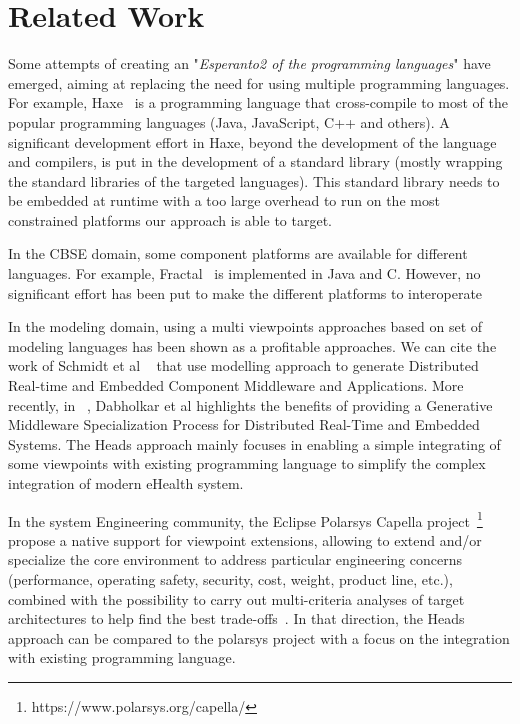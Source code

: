 \section{Related Work}

Some attempts of creating an "\textit{Esperanto2 of the programming languages}" have emerged, aiming at replacing the need for using multiple programming languages. For example, Haxe~\cite{dasnois2011haxe} is a programming language that cross-compile to most of the popular programming languages (Java, JavaScript, C++ and others). A significant development effort in Haxe, beyond the development of the language and compilers, is put in the development of a standard library (mostly wrapping the standard libraries of the targeted languages). This standard library needs to be embedded at runtime with a too large overhead to run on the most constrained platforms our approach is able to target. 

In the CBSE domain, some component platforms are available for different languages. For example, Fractal~\cite{bruneton2006fractal} is implemented in Java and C. However, no significant effort has been put to make the different platforms to interoperate 

In the modeling domain, using a multi viewpoints approaches based on set of modeling languages has been shown as a profitable approaches. We can cite the work of Schmidt et al ~\cite{DBLP:conf/middleware/GokhaleSLNW03} that use modelling approach to generate Distributed Real-time and Embedded Component Middleware and Applications. More recently, in  ~\cite{5753608}, Dabholkar et al highlights the benefits of providing a Generative Middleware Specialization Process for Distributed Real-Time and Embedded Systems.  The Heads approach  mainly focuses in enabling a simple integrating of some viewpoints with existing programming language to simplify the complex integration of modern eHealth system. 

In the system Engineering community, the Eclipse Polarsys Capella project~\footnote{https://www.polarsys.org/capella/} propose a  native support for viewpoint extensions, allowing to extend and/or specialize the core environment to address particular engineering concerns (performance, operating safety, security, cost, weight, product line, etc.), combined with the possibility to carry out multi-criteria analyses of target architectures to help find the best trade-offs~\cite{voirin2013arcadia}. In that direction, the Heads approach can be compared to the polarsys project with a focus on the integration  with existing programming language.

